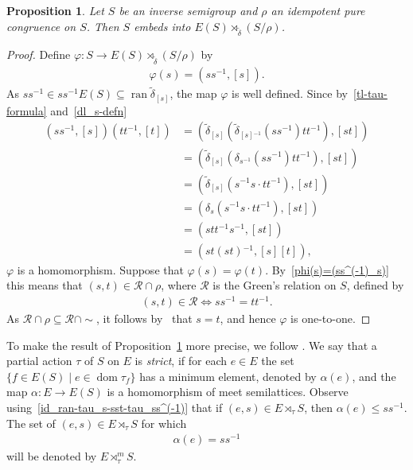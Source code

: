 \documentclass[reqno]{amsart}
\newtheorem{prop}[thrm]{Proposition}
\theoremstyle{definition}
\renewcommand{\iff}{\Leftrightarrow}
\newcommand{\cR}{\mathcal R}
\newcommand{\dom}[1]{\operatorname{\mathrm{dom}}{#1}}
\newcommand{\ran}[1]{\operatorname{\mathrm{ran}}{#1}}
\newcommand{\m}{{}^{-1}}
\newcommand{\0}{\theta}
\newcommand{\dt}{\delta}
\newcommand{\tl}{\tilde}
\newcommand{\sst}{\subseteq}
\newcommand{\rt}{\rtimes}
\begin{document}
\begin{prop}\label{S-embeds-into-E(S)*S}
	Let $S$ be an inverse semigroup and $\rho$ an idempotent pure congruence on $S$. Then $S$ embeds into $E(S)\rt_{\tl\dt}(S/\rho)$.
\end{prop}
\begin{proof}
	Define $\varphi:S\to E(S)\rt_{\tl\dt}(S/\rho)$ by 
	\begin{align}\label{phi(s)=(ss^(-1)_s)}
	\varphi(s)=(ss\m,[s]).
	\end{align}
	As $ss\m\in ss\m E(S)\subseteq\ran{\tl\dt_{[s]}}$, the map $\varphi$ is well defined. Since by~\eqref{tl-tau-formula} and~\eqref{dl_s-defn}
	\begin{align*}
	(ss\m,[s])(tt\m,[t])&=(\tl\dt_{[s]}(\tl\dt_{[s]\m}(ss\m)tt\m),[st])\\
	&=(\tl\dt_{[s]}(\dt_{s\m}(ss\m)tt\m),[st])\\
	&=(\tl\dt_{[s]}(s\m s\cdot tt\m),[st])\\
	&=(\dt_s(s\m s\cdot tt\m),[st])\\
	&=(stt\m s\m,[st])\\
	&=(st(st)\m,[s][t]),
	\end{align*}
	$\varphi$ is a homomorphism. Suppose that $\varphi(s)=\varphi(t)$. By~\eqref{phi(s)=(ss^(-1)_s)} this means that $(s,t)\in\cR\cap\rho$, where $\cR$ is the Green's relation on $S$, defined by 
	\begin{align*}
	(s,t)\in\cR\iff ss\m=tt\m.
	\end{align*}
	As $\cR\cap\rho\sst\cR\cap\sim$, it follows by~\cite[Lemma III.2.13]{Petrich} that $s=t$,
	and hence $\varphi$ is one-to-one.
\end{proof}

To make the result of Proposition~\ref{S-embeds-into-E(S)*S} more precise, we follow \cite{O'Carroll77}. We say that a partial action $\tau$ of $S$ on $E$ is {\it strict}, if for each $e\in E$ the set $\{f\in E(S)\mid e\in\dom{\tau_f}\}$ has a minimum element, denoted by $\alpha(e)$, and the map $\alpha:E\to E(S)$ is a homomorphism of meet semilattices. Observe using~\eqref{id_ran-tau_s-sst-tau_ss^(-1)} that if $(e,s)\in E\rt_\tau S$, then $\alpha(e)\le ss\m$. The set of $(e,s)\in E\rt_\tau S$ for which 
\begin{align}\label{af(e)=ss^(-1)}
\alpha(e)=ss\m
\end{align}
will be denoted by $E\rt^m_\tau S$.
\end{document}
